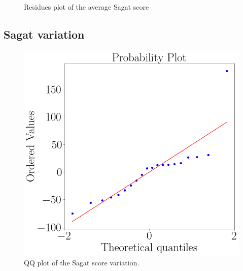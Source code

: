 \begin{figure}[!htb]
\begin{minipage}{0.45\linewidth}
        \caption{Residues plot of the average Sagat score}
        \label{fig:residual_sagat_average}
    \end{minipage}
\end{figure}

\FloatBarrier

\subsection{Sagat variation}

\begin{figure}[!htb]
    \begin{minipage}{0.45\linewidth}
        \centering
        \includegraphics[width = \linewidth]{Resultados/ECG/Figuras/png/qqplot_sdnn.png}
        \caption{QQ plot of the Sagat score variation.}
        \label{fig:qqplot_sagat_var}
    \end{minipage}
    \begin{minipage}{0.1\linewidth}
        \hfill
    \end{minipage}
    \begin{minipage}{0.45\linewidth}
        \centering

\end{minipage}
\end{figure}
